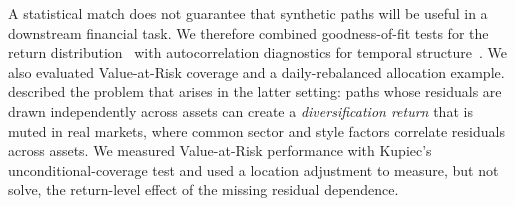 A statistical match does not guarantee that synthetic paths will be
useful in a downstream financial task. We therefore combined
goodness-of-fit tests for the return
distribution~\cite{kolmogorov1933, smirnov1948, andersonDarling1952}
with autocorrelation diagnostics for temporal structure~\cite{cont2001}.
We also evaluated Value-at-Risk coverage and a daily-rebalanced
allocation example. \citet{boothFama1992} described the problem that
arises in the latter setting: paths whose residuals are drawn
independently across assets can create a
\emph{diversification return} that is muted in real markets, where
common sector and style factors correlate residuals across assets.
We measured Value-at-Risk performance with Kupiec's
unconditional-coverage test and used a location adjustment to measure,
but not solve, the return-level effect of the missing residual
dependence.
